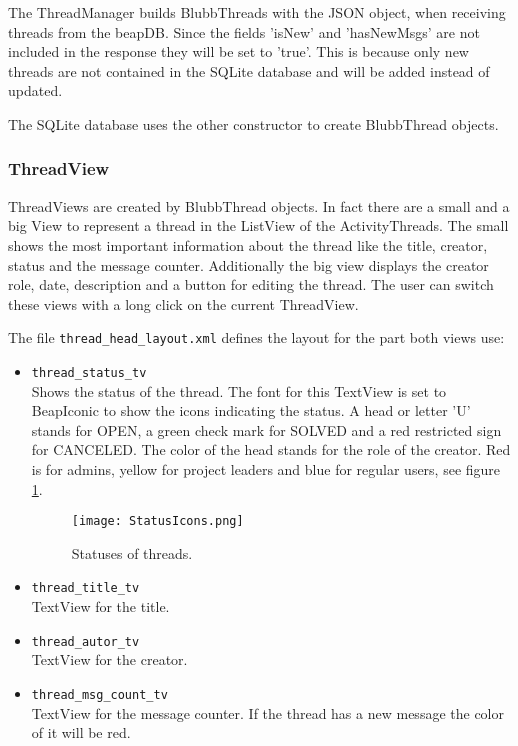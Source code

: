 \documentclass[12pt,a4paper,oneside]{report}
\newcommand{\code}[1]{\lstinline{#1}}
\begin{document}
The ThreadManager builds BlubbThreads with the JSON object, when receiving threads from the beapDB. Since the fields 'isNew' and 'hasNewMsgs' are not included in the response they will be set to 'true'. This is because only new threads are not contained in the SQLite database and will be added instead of updated. 

The SQLite database uses the other constructor to create BlubbThread objects.

\subsubsection{ThreadView}
ThreadViews are created by BlubbThread objects. In fact there are a small and a big View to represent a thread in the ListView of the ActivityThreads. 
The small shows the most important information about the thread like the title, creator, status and the message counter. Additionally the big view displays the creator role, date, description and a button for editing the thread. The user can switch these views with a long click on the current ThreadView. 

The file \code{thread_head_layout.xml} defines the layout for the part both views use:
\begin{itemize}
\item \code{thread_status_tv}\\
Shows the status of the thread. The font for this TextView is set to BeapIconic to show the icons indicating the status. A head or letter 'U' stands for OPEN, a green check mark for SOLVED and a red restricted sign for CANCELED. The color of the head stands for the role of the creator. Red is for admins, yellow for project leaders and blue for regular users, see figure \ref{fig:ThreadStatusIcons}. 
\begin{figure}[!ht]
	\centering
    \texttt{[image: StatusIcons.png]}
	\caption{Statuses of threads.}
	\label{fig:ThreadStatusIcons}
\end{figure}

\item \code{thread_title_tv}\\
TextView for the title.

\item \code{thread_autor_tv}\\
TextView for the creator.

\item \code{thread_msg_count_tv}\\
TextView for the message counter. If the thread has a new message the color of it will be red.

\end{itemize}
\end{document}
